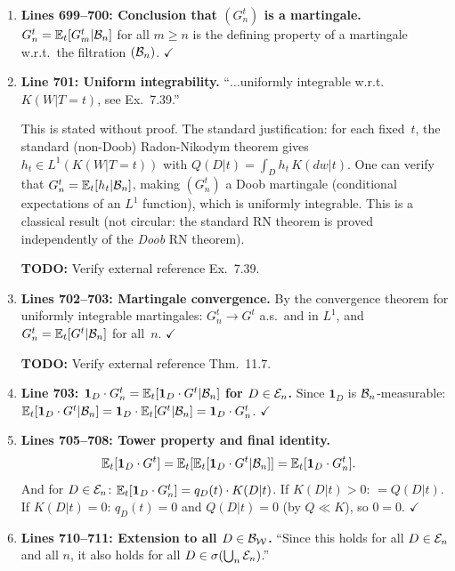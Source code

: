 \documentclass{article}
\begin{document}
\begin{enumerate}[leftmargin=*]
  \item \textbf{Lines 699--700: Conclusion that $(G_n^t)$ is a martingale.}
    $G_n^t = \mathbb{E}_t[G_m^t|\mathcal{B}_n]$ for all $m\ge n$ is the defining property
    of a martingale w.r.t.\ the filtration $(\mathcal{B}_n)$.  $\checkmark$

  \item \textbf{Line 701: Uniform integrability.}
    ``$\ldots$uniformly integrable w.r.t.\ $K(W|T=t)$, see \cite{Kle20} Ex.\ 7.39.''

    This is stated without proof.  The standard justification: for each fixed~$t$,
    the standard (non-Doob) Radon-Nikodym theorem gives $h_t\in L^1(K(W|T=t))$
    with $Q(D|t)=\int_D h_t\,K(dw|t)$.  One can verify that
    $G_n^t = \mathbb{E}_t[h_t|\mathcal{B}_n]$, making $(G_n^t)$ a Doob martingale
    (conditional expectations of an $L^1$ function), which is uniformly
    integrable.  This is a classical result (not circular: the standard RN
    theorem is proved independently of the \emph{Doob} RN theorem).

    \textbf{TODO:} Verify external reference \cite{Kle20} Ex.\ 7.39.

  \item \textbf{Lines 702--703: Martingale convergence.}
    By the convergence theorem for uniformly integrable martingales:
    $G_n^t \to G^t$ a.s.\ and in $L^1$, and
    $G_n^t = \mathbb{E}_t[G^t|\mathcal{B}_n]$ for all~$n$.  $\checkmark$

    \textbf{TODO:} Verify external reference \cite{Kle20} Thm.\ 11.7.

  \item \textbf{Line 703: $\mathbf{1}_D\cdot G_n^t = \mathbb{E}_t[\mathbf{1}_D\cdot G^t|\mathcal{B}_n]$
    for $D\in\mathcal{E}_n$.}
    Since $\mathbf{1}_D$ is $\mathcal{B}_n$-measurable:
    $\mathbb{E}_t[\mathbf{1}_D\cdot G^t|\mathcal{B}_n] = \mathbf{1}_D\cdot\mathbb{E}_t[G^t|\mathcal{B}_n]
    = \mathbf{1}_D\cdot G_n^t$.  $\checkmark$

  \item \textbf{Lines 705--708: Tower property and final identity.}
    \begin{align*}
      \mathbb{E}_t[\mathbf{1}_D\cdot G^t]
        &= \mathbb{E}_t[\mathbb{E}_t[\mathbf{1}_D\cdot G^t|\mathcal{B}_n]]
         = \mathbb{E}_t[\mathbf{1}_D\cdot G_n^t].
    \end{align*}
    And for $D\in\mathcal{E}_n$:
    $\mathbb{E}_t[\mathbf{1}_D\cdot G_n^t] = q_D(t)\cdot K(D|t)$.
    If $K(D|t)>0$: $= Q(D|t)$.  If $K(D|t)=0$: $q_D(t)=0$ and
    $Q(D|t)=0$ (by $Q\ll K$), so $0=0$.  $\checkmark$

  \item \textbf{Lines 710--711: Extension to all $D\in\mathcal{B}_{\mathcal{W}}$.}
    ``Since this holds for all $D\in\mathcal{E}_n$ and all $n$, it also holds for
    all $D\in\sigma(\bigcup_n\mathcal{E}_n)$.''


\end{enumerate}
\end{document}
